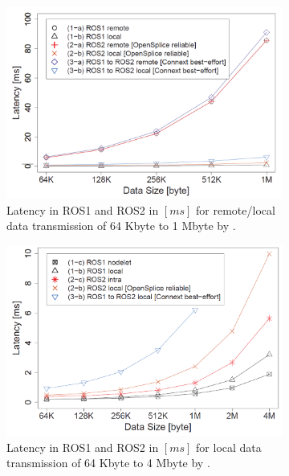 \begin{figure}
	\centering
\begin{subfigure}[b]{0.49\textwidth}
	\centering
	\includegraphics[width=\textwidth]{Bilder/PerformEndtoEnd.PNG}
	\caption{Latency in ROS1 and ROS2 in $[ms]$ for remote/local data transmission of 64 Kbyte to 1 Mbyte by \cite{ROSDDS}.}
	\label{fig_ROS1vsROS2}
\end{subfigure}
\hfill
\begin{subfigure}[b]{0.49\textwidth}
	\centering
	\includegraphics[width=\textwidth]{Bilder/PerformIntra.PNG}
	\caption{Latency in ROS1 and ROS2 in $[ms]$ for local data transmission of 64 Kbyte to 4 Mbyte by \cite{ROSDDS}.}
	\label{fig_ROS1vsROS2Intra}
\end{subfigure}
	\begin{subfigure}[b]{0.49\textwidth}
		\centering

\end{subfigure}
\end{figure}

